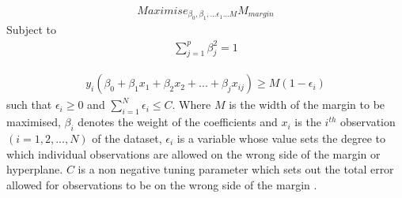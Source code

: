\documentclass[11pt]{article}
\begin{document}
\begin{align}
Maximise_{\beta_{0}, \beta_{1},...\epsilon_{1}...M}  M_{margin} 
\end{align}
Subject to 
\begin{align}
\sum^{p}_{j=1} \beta^{2}_{j} = 1
\end{align}

\begin{align}
y_{i}( \beta_{0} + \beta_{1}x_{1} + \beta_{2}x_{2} +...+ \beta_{j}x_{ij}) \geq M(1- \epsilon_{i})
\end{align}
such that $ \epsilon_{i} \geq 0$ and $ \sum^{N}_{i = 1} \epsilon_{i} \leq C$. Where $M$ is the width of the margin to be maximised, $ \beta_{i}$ denotes the weight of the coefficients and $x_{i}$ is the $i^{th}$ observation $(i = 1,2,...,N)$ of the dataset, $\epsilon_{i}$ is a variable whose value sets the degree to which individual observations are allowed on the wrong side of the margin or hyperplane. $C$ is a non negative tuning parameter which sets out the total error allowed for observations to be on the wrong side of the margin \cite{James2013}. 
\end{document}
